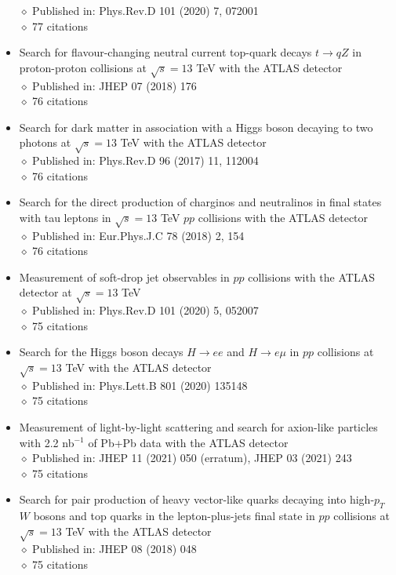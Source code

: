 \documentclass[margin, 10pt]{res} %
\begin{document}
\begin{resume}
\begin{itemize}
$\diamond$ Published in: Phys.Rev.D 101 (2020) 7, 072001\\
$\diamond$ 77 citations
\item Search for flavour-changing neutral current top-quark decays $t \rightarrow qZ$ in proton-proton collisions at $\sqrt{s} = 13$ TeV with the ATLAS detector\\
$\diamond$ Published in: JHEP 07 (2018) 176\\
$\diamond$ 76 citations
\item Search for dark matter in association with a Higgs boson decaying to two photons at $\sqrt{s} = 13$ TeV with the ATLAS detector\\
$\diamond$ Published in: Phys.Rev.D 96 (2017) 11, 112004\\
$\diamond$ 76 citations
\item Search for the direct production of charginos and neutralinos in final states with tau leptons in $\sqrt{s} = 13$ TeV $pp$ collisions with the ATLAS detector\\
$\diamond$ Published in: Eur.Phys.J.C 78 (2018) 2, 154\\
$\diamond$ 76 citations
\item Measurement of soft-drop jet observables in $pp$ collisions with the ATLAS detector at $\sqrt{s} = 13$ TeV\\
$\diamond$ Published in: Phys.Rev.D 101 (2020) 5, 052007\\
$\diamond$ 75 citations
\item Search for the Higgs boson decays $H \rightarrow ee$ and $H \rightarrow e\mu$ in $pp$ collisions at $\sqrt{s} = 13$ TeV with the ATLAS detector\\
$\diamond$ Published in: Phys.Lett.B 801 (2020) 135148\\
$\diamond$ 75 citations
\item Measurement of light-by-light scattering and search for axion-like particles with 2.2 nb$^{-1}$ of Pb+Pb data with the ATLAS detector\\
$\diamond$ Published in: JHEP 11 (2021) 050 (erratum), JHEP 03 (2021) 243\\
$\diamond$ 75 citations
\item Search for pair production of heavy vector-like quarks decaying into high-$p_{T}$ $W$ bosons and top quarks in the lepton-plus-jets final state in $pp$ collisions at $\sqrt{s} = 13$ TeV with the ATLAS detector\\
$\diamond$ Published in: JHEP 08 (2018) 048\\
$\diamond$ 75 citations

\end{itemize}
\end{resume}
\end{document}
